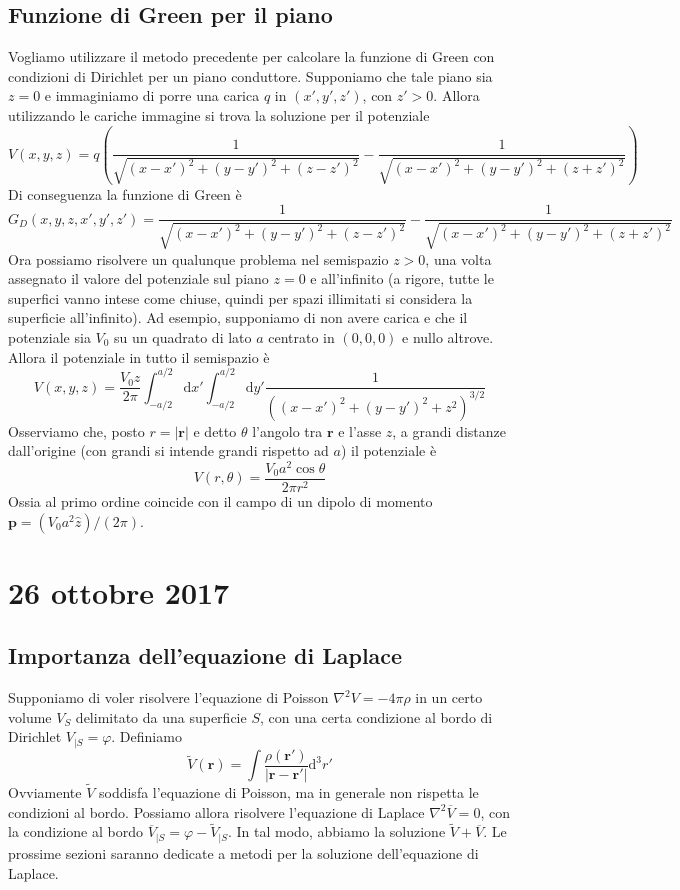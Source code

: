 \documentclass[a4paper,11pt]{book}
\newcommand{\dif}{\mathrm{d}}
\let\oldnabla\nabla
\renewcommand{\nabla}{\vec{\oldnabla}}
\newcommand{\lap}{\oldnabla^2}
\renewcommand{\vec}[1]{\mathbf{#1}}
\theoremstyle{theorem}
\theoremstyle{definition}
\begin{document}
\subsection{Funzione di Green per il piano}
Vogliamo utilizzare il metodo precedente per calcolare la funzione di Green con condizioni di Dirichlet per un piano conduttore. Supponiamo che tale piano sia $z=0$ e immaginiamo di porre una carica $q$ in $(x',y',z')$, con $z'>0$. Allora utilizzando le cariche immagine si trova la soluzione per il potenziale
\[V(x,y,z)=q\left(\frac{1}{\sqrt{(x-x')^2+(y-y')^2+(z-z')^2}}-\frac{1}{\sqrt{(x-x')^2+(y-y')^2+(z+z')^2}}\right)\]
Di conseguenza la funzione di Green è
\begin{equation}\label{greenpiano}
	G_D(x,y,z,x',y',z')=\frac{1}{\sqrt{(x-x')^2+(y-y')^2+(z-z')^2}}-\frac{1}{\sqrt{(x-x')^2+(y-y')^2+(z+z')^2}}
\end{equation}
Ora possiamo risolvere un qualunque problema nel semispazio $z>0$, una volta assegnato il valore del potenziale sul piano $z=0$ e all'infinito (a rigore, tutte le superfici vanno intese come chiuse, quindi per spazi illimitati si considera la superficie all'infinito). Ad esempio, supponiamo di non avere carica e che il potenziale sia $V_0$ su un quadrato di lato $a$ centrato in $(0,0,0)$ e nullo altrove. Allora il potenziale in tutto il semispazio è
\[
	V(x,y,z)=\frac{V_0z}{2\pi}\int_{-a/2}^{a/2}\dif x'\int_{-a/2}^{a/2}\dif y'\frac{1}{\left((x-x')^2+(y-y')^2+z^2\right)^{3/2}}
\]
Osserviamo che, posto $r=|\vec{r}|$ e detto $\theta$ l'angolo tra $\vec{r}$ e l'asse $z$, a grandi distanze dall'origine (con grandi si intende grandi rispetto ad $a$) il potenziale è
\[
	V(r,\theta)=\frac{V_0a^2\cos\theta}{2\pi r^2}
\]
Ossia al primo ordine coincide con il campo di un dipolo di momento $\vec{p}=(V_0a^2\hat{z})/(2\pi)$.
\newpage
\section{26 ottobre 2017}
\subsection{Importanza dell'equazione di Laplace}
Supponiamo di voler risolvere l'equazione di Poisson $\lap V=-4\pi\rho$ in un certo volume $V_S$ delimitato da una superficie $S$, con una certa condizione al bordo di Dirichlet $V_{|S}=\varphi$. Definiamo
\[\tilde{V}(\vec{r})=\int\frac{\rho(\vec{r}')}{|\vec{r}-\vec{r}'|}\dif^3r'\]
Ovviamente $\tilde{V}$ soddisfa l'equazione di Poisson, ma in generale non rispetta le condizioni al bordo. Possiamo allora risolvere l'equazione di Laplace $\lap\overline{V}=0$, con la condizione al bordo $\overline{V}_{|S}=\varphi-\tilde{V}_{|S}$. In tal modo, abbiamo la soluzione $\tilde{V}+\overline{V}$. Le prossime sezioni saranno dedicate a metodi per la soluzione dell'equazione di Laplace.
\end{document}

